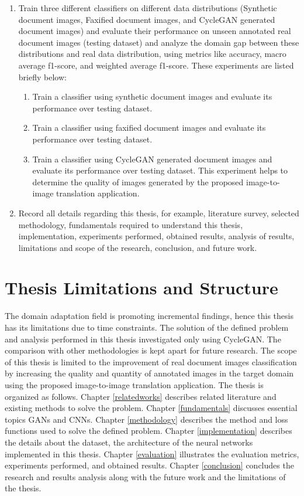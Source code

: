 \begin{enumerate}
\item Train three different classifiers on different data distributions (Synthetic document images, Faxified document images, and \ac{CycleGAN} generated document images) and evaluate their performance on unseen annotated real document images (testing dataset) and analyze the domain gap between these distributions and real data distribution, using metrics like accuracy, macro average f1-score, and weighted average f1-score. These experiments are listed briefly below:
	\begin{enumerate}
	     	\item Train a classifier using synthetic document images and evaluate its performance over testing dataset.
     	     	\item Train a classifier using faxified document images and evaluate its performance over testing dataset.
     		\item Train a classifier using \ac{CycleGAN} generated document images and evaluate its performance over testing dataset. This experiment helps to determine the quality of images generated by the proposed image-to-image translation application.
    	\end{enumerate}
\item Record all details regarding this thesis, for example, literature survey, selected methodology, fundamentals required to understand this thesis, implementation, experiments performed, obtained results, analysis of results, limitations and scope of the research, conclusion, and future work.
\end{enumerate}


\section{Thesis Limitations and Structure}\label{thesisstructurelimitations}
The domain adaptation field is promoting incremental findings, hence this thesis has its limitations due to time constraints. The solution of the defined problem and analysis performed in this thesis investigated only using \ac{CycleGAN}. The comparison with other methodologies is kept apart for future research. The scope of this thesis is limited to the improvement of real document images classification by increasing the quality and quantity of annotated images in the target domain using the proposed image-to-image translation application. The thesis is organized as follows. Chapter \ref{relatedworks} describes related literature and existing methods to solve the problem. Chapter \ref{fundamentals} discusses essential topics \acp{GAN} and \acp{CNN}. Chapter \ref{methodology} describes the method and loss functions used to solve the defined problem. Chapter \ref{implementation} describes the details about the dataset, the architecture of the neural networks implemented in this thesis. Chapter \ref{evaluation} illustrates the evaluation metrics, experiments performed, and obtained results. Chapter \ref{conclusion} concludes the research and results analysis along with the future work and the limitations of the thesis.






